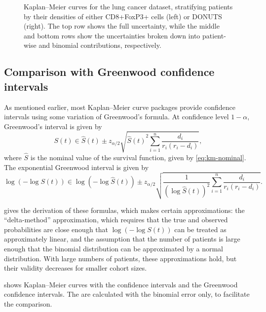 \documentclass[article]{jss}
\newcommand{\KM}{Kaplan--Meier} %
\begin{document}
\begin{figure}[p]
\begin{subfigure}[t]{0.49\textwidth}
    \caption{\label{fig:lung-dataset-donuts-binomial}}
  \end{subfigure}
  \caption{\label{fig:lung-dataset} \KM{} curves for the lung cancer dataset, stratifying patients by their densities of either CD8+FoxP3+ cells (left) or DONUTS (right).  The top row shows the full uncertainty, while the middle and bottom rows show the uncertainties broken down into patient-wise and binomial contributions, respectively.}
\end{figure}

\subsection{Comparison with Greenwood confidence intervals}\label{sec:compare-to-greenwood}

As mentioned earlier, most \KM{} curve packages provide confidence intervals using some variation of Greenwood's formula.  At confidence level \(1-\alpha\), Greenwood's interval is given by
\begin{equation}
\label{eq:greenwood}
S(t)\in\hat{S}(t) \pm z_{\alpha/2} \sqrt{{\hat{S}(t)}^2{\sum_{i=1}^{n} \frac{d_i}{r_i(r_i-d_i)}}},
\end{equation}
where \(\hat{S}\) is the nominal value of the survival function, given by \cref{eq:km-nominal}.  The exponential Greenwood interval is given by
\begin{equation}
\label{eq:exponential-greenwood}
\log{\left(-\log S(t)\right)} \in \log{\left(-\log \hat{S}(t)\right)} \pm z_{\alpha/2} \sqrt{\frac{1}{{\left(\log \hat{S}(t)\right)}^2} \sum_{i=1}^{n} \frac{d_i}{r_i(r_i-d_i)}}.
\end{equation}

\citet{GreenwoodNotes} gives the derivation of these formulas, which makes certain approximations: the ``delta-method'' approximation, which requires that the true and observed probabilities are close enough that \(\log\left(-\log S(t)\right)\) can be treated as approximately linear, and the assumption that the number of patients is large enough that the binomial distribution can be approximated by a normal distribution.  With large numbers of patients, these approximations hold, but their validity decreases for smaller cohort sizes.

 shows \KM{} curves with the  confidence intervals and the Greenwood confidence intervals.  The  are calculated with the binomial error only, to facilitate the comparison.
\end{document}

